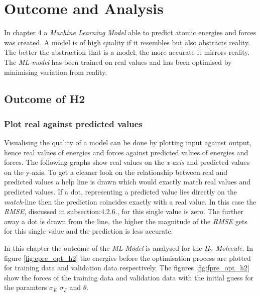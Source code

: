 \chapter{Outcome and Analysis}
\label{chapter:5}

In chapter 4 a \textit{Machine Learning Model} able to predict atomic energies and forces was created. A model is of high quality if it resembles but also abstracts reality. The better the abstraction that is a model, the more accurate it mirrors reality. The \textit{ML-model} has been trained on real values and has been optimised by minimising variation from reality. 


\section{Outcome of H2}
\label{section:5.1}
\subsection{Plot real against predicted values}
\label{subsection:5.1.1}
Visualising the quality of a model can be done by plotting input against output, hence real values of energies and forces against predicted values of energies and forces. The following graphs show real values on the \textit{x-axis} and predicted values on the {y-axis}. To get a cleaner look on the relationship between real and predicted values a help line is drawn which would exactly match real values and predicted values. If a dot, representing a predicted value lies directly on the \textit{match}-line then the prediction coincides exactly with a real value. In this case the \textit{RMSE}, discussed in {subsection:4.2.6.}, for this single value is zero. The further away a dot is drawn from the line, the higher the magnitude of the \textit{RMSE} gets for this single value and the prediction is less accurate. 

In this chapter the outcome of the \textit{ML-Model} is analysed for the \textit{$H_2$ Molecule}. In figure  \ref{fig:epre_opt_h2} the energies before the optimisation process are plotted for training data and validation data respectively. The figures \ref{fig:fpre_opt_h2} show the forces of the training data and validation data with the initial guess for the paramters $\sigma_E$ $\sigma_F$ and $\theta$. 


